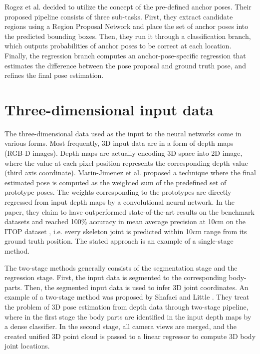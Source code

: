 \vspace{5mm}
\noindent
Rogez et al. \cite{lcrnet} decided to utilize the concept of the pre-defined anchor poses. Their proposed pipeline consists of three sub-tasks. First, they extract candidate regions using a Region Proposal Network \cite{NIPS2015_5638} and place the set of anchor poses into the predicted bounding boxes. Then, they run it through a classification branch, which outputs probabilities of anchor poses to be correct at each location. Finally, the regression branch computes an anchor-pose-specific regression that estimates the difference between the pose proposal and ground truth pose, and refines the final pose estimation. 

\section{Three-dimensional input data}
\noindent The three-dimensional data used as the input to the neural networks come in various forms. Most frequently, 3D input data are in a form of depth maps (RGB-D images). Depth maps are actually encoding 3D space into 2D image, where the value at each pixel position represents the corresponding depth value (third axis coordinate). Marin-Jimenez et al. \cite{Marin18jvcir} proposed a technique where the final estimated pose is computed as the weighted sum of the predefined set of prototype poses. The weights corresponding to the prototypes are directly regressed from input depth maps by a convolutional neural network. In the paper, they claim to have outperformed state-of-the-art results on the benchmark datasets and reached 100\% accuracy in mean average precision at 10cm on the ITOP dataset \cite{haque2016viewpoint}, i.e. every skeleton joint is predicted within 10cm range from its ground truth position. The stated approach is an example of a single-stage method.\par
\vspace{5mm}
\noindent The two-stage methods generally consists of the segmentation stage and the regression stage. First, the input data is segmented to the corresponding body-parts. Then, the segmented input data is used to infer 3D joint coordinates. An example of a two-stage method was proposed by Shafaei and Little \cite{Shafaei16}. They treat the problem of 3D pose estimation from depth data through two-stage pipeline, where in the first stage the body parts are identified in the input depth maps by a dense classifier. In the second stage, all camera views are merged, and the created unified 3D point cloud is passed to a linear regressor to compute 3D body joint locations. \par
